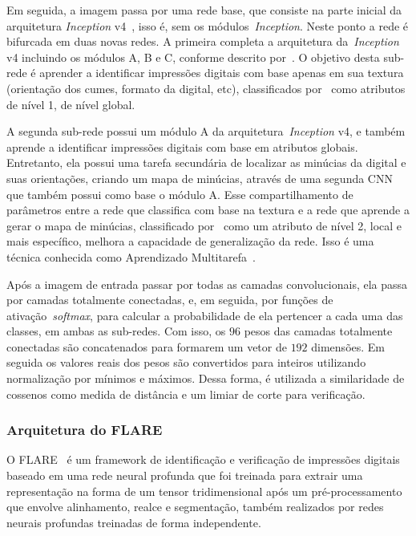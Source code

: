 Em seguida, a imagem passa por uma rede base, que consiste na parte inicial da arquitetura \textit{Inception} v4~\cite{inception-v4}, isso é, sem os módulos~\textit{Inception}. Neste ponto a rede é bifurcada em duas novas redes. A primeira completa a arquitetura da~\textit{Inception} v4 incluindo os módulos A, B e C, conforme descrito por~. O objetivo desta sub-rede é aprender a identificar impressões digitais com base apenas em sua textura (orientação dos cumes, formato da digital, etc), classificados por~ como atributos de nível 1, de nível global.

A segunda sub-rede possui um módulo A da arquitetura~\textit{Inception} v4, e também aprende a identificar impressões digitais com base em atributos globais. Entretanto, ela possui uma tarefa secundária de localizar as minúcias da digital e suas orientações, criando um mapa de minúcias, através de uma segunda CNN que também possui como base o módulo A. Esse compartilhamento de parâmetros entre a rede que classifica com base na textura e a rede que aprende a gerar o mapa de minúcias, classificado por~ como um atributo de nível 2, local e mais específico, melhora a capacidade de generalização da rede. Isso é uma técnica conhecida como Aprendizado Multitarefa~\cite{multitask-learning}.

Após a imagem de entrada passar por todas as camadas convolucionais, ela passa por camadas totalmente conectadas, e, em seguida, por funções de ativação~\textit{softmax}, para calcular a probabilidade de ela pertencer a cada uma das classes, em ambas as sub-redes. Com isso, os $96$ pesos das camadas totalmente conectadas são concatenados para formarem um vetor de $192$ dimensões. Em seguida os valores reais dos pesos são convertidos para inteiros utilizando normalização por mínimos e máximos. Dessa forma, é utilizada a similaridade de cossenos como medida de distância e um limiar de corte para verificação.


\subsubsection{Arquitetura do FLARE}\label{subsubsec:flare-arch}

O FLARE~\cite{flare} é um framework de identificação e verificação de impressões digitais baseado em uma rede neural profunda que foi treinada para extrair uma representação na forma de um tensor tridimensional após um pré-processamento que envolve alinhamento, realce e segmentação, também realizados por redes neurais profundas treinadas de forma independente.

